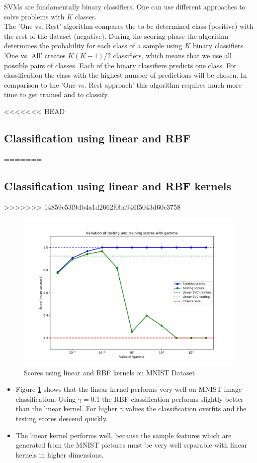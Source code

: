 \documentclass{article}
\begin{document}
SVMs are fundamentally binary classifiers. One can use different approaches to solve problems with $K$ classes. \\
The 'One vs. Rest' algorithm compares the to be determined class (positive) with the rest of the dataset (negative). During the scoring phase the algorithm determines the probability for each class of a sample using $K$ binary classifiers.\\
'One vs. All' creates $K(K-1)/2$ classifiers, which means that we use all possible pairs of classes. Each of the binary classifiers predicts one class. For classification the class with the highest number of predictions will be chosen. In comparison to the 'One vs. Rest approach' this algorithm requires much more time to get trained and to classify.

<<<<<<< HEAD
\subsection{Classification using linear and RBF}
=======
\newpage

\subsection{Classification using linear and RBF kernels}
>>>>>>> 14859c53f9db4a1d2662f0ba946f5043d60c3758

\begin{figure}[!ht]
	\centering
	\includegraphics[width=.8\textwidth]{./Figures/3a_score.pdf}
	\caption{Scores using linear and RBF kernels on MNIST Dataset}
	\label{multiclass_classification}
\end{figure}

\begin{itemize}

	\item Figure \ref{multiclass_classification} shows that the linear kernel performs very well on MNIST image classification. Using $\gamma = 0.1$ the RBF classification performs slightly better than the linear kernel. For higher $\gamma$ values the classification overfits and the testing scores descend quickly.
	
	\item The linear kernel performs well, because the sample features which are generated from the MNIST pictures must be very well separable with linear kernels in higher dimensions. 

\end{itemize}
\end{document}
